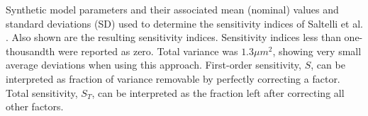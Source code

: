 \documentclass[10pt]{article}
\begin{document}
\begin{table}[!ht]
\begin{flushleft}Synthetic model parameters and their associated mean (nominal) values and standard deviations (SD) used to determine the sensitivity indices of Saltelli et al. \cite{saltelli2010variance}. Also shown are the resulting sensitivity indices. Sensitivity indices less than one-thousandth were reported as zero. Total variance was $1.3 \mu m^2$, showing very small average deviations when using this approach. First-order sensitivity, $S$, can be interpreted as fraction of variance removable by perfectly correcting a factor. Total sensitivity, $S_T$, can be interpreted as the fraction left after correcting all other factors.
\end{flushleft}
\label{tab:parameters}
\end{table}
\end{document}
